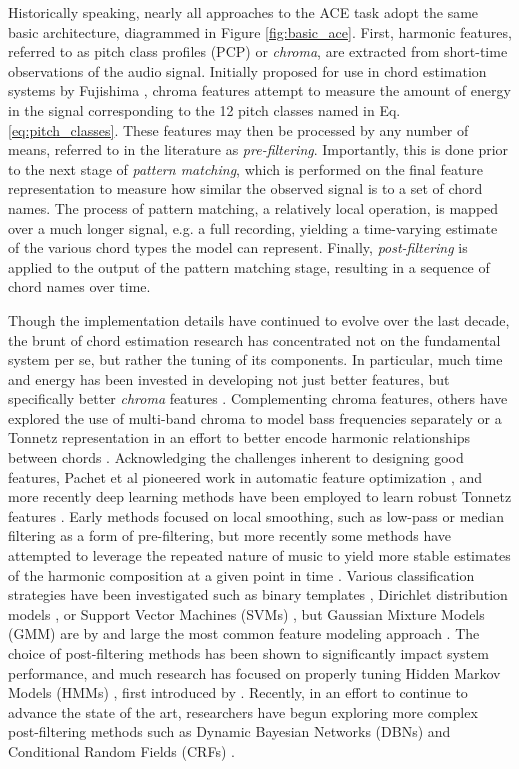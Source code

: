 Historically speaking, nearly all approaches to the ACE task adopt the same basic architecture, diagrammed in Figure \ref{fig:basic_ace}.
First, harmonic features, referred to as pitch class profiles (PCP) or \emph{chroma}, are extracted from short-time observations of the audio signal.
Initially proposed for use in chord estimation systems by Fujishima \cite{fujishima1999}, chroma features attempt to measure the amount of energy in the signal corresponding to the 12 pitch classes named in Eq. \ref{eq:pitch_classes}.
These features may then be processed by any number of means, referred to in the literature as \emph{pre-filtering}.
Importantly, this is done prior to the next stage of \emph{pattern matching}, which is performed on the final feature representation to measure how similar the observed signal is to a set of chord names.
The process of pattern matching, a relatively local operation, is mapped over a much longer signal, e.g. a full recording, yielding a time-varying estimate of the various chord types the model can represent.
Finally, \emph{post-filtering} is applied to the output of the pattern matching stage, resulting in a sequence of chord names over time.

Though the implementation details have continued to evolve over the last decade, the brunt of chord estimation research has concentrated not on the fundamental system per se, but rather the tuning of its components.
In particular, much time and energy has been invested in developing not just better features, but specifically better \emph{chroma} features \cite{muller2010}.
Complementing chroma features, others have explored the use of multi-band chroma to model bass frequencies separately \cite{Mauch2009?} or a Tonnetz representation in an effort to better encode harmonic relationships between chords \cite{Lee2007}.
Acknowledging the challenges inherent to designing good features, Pachet et al pioneered work in automatic feature optimization \cite{pachet2004}, and more recently deep learning methods have been employed to learn robust Tonnetz features \cite{ejh2011}.
Early methods focused on local smoothing, such as low-pass \cite{} or median \cite{} filtering as a form of pre-filtering, but more recently some methods have attempted to leverage the repeated nature of music to yield more stable estimates of the harmonic composition at a given point in time \cite{Cho2011}.
Various classification strategies have been investigated such as binary templates \cite{?}, Dirichlet distribution models \cite{Burgoyne2008?}, or Support Vector Machines (SVMs) \cite{weller2009}, but Gaussian Mixture Models (GMM) are by and large the most common feature modeling approach \cite{a,b,c}.
The choice of post-filtering methods has been shown to significantly impact system performance, and much research has focused on properly tuning Hidden Markov Models (HMMs) \cite{Cho2010}, first introduced by \cite{sheh2003}.
Recently, in an effort to continue to advance the state of the art, researchers have begun exploring more complex post-filtering methods such as Dynamic Bayesian Networks (DBNs) \cite{mauch2010b, McVicar2013} and Conditional Random Fields (CRFs) \cite{?}.


